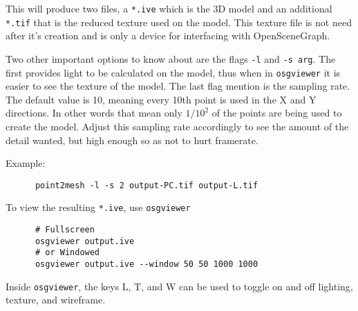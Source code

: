 This will produce two files, a \verb#*.ive# which is the 3D model and
an additional \verb#*.tif# that is the reduced texture used on the
model. This texture file is not need after it's creation and is only a
device for interfacing with OpenSceneGraph.

Two other important options to know about are the flags \verb#-l# and
\verb#-s arg#. The first provides light to be calculated on the model,
thus when in \verb#osgviewer# it is easier to see the texture of the
model. The last flag mention is the sampling rate. The default value
is 10, meaning every 10th point is used in the X and Y directions. In
other words that mean only $1/10^2$ of the points are being used to
create the model. Adjust this sampling rate accordingly to see the
amount of the detail wanted, but high enough so as not to hurt
framerate.

Example:
\begin{verbatim}
      point2mesh -l -s 2 output-PC.tif output-L.tif
\end{verbatim}

To view the resulting \verb#*.ive#, use \verb#osgviewer#

\begin{verbatim}
      # Fullscreen
      osgviewer output.ive
      # or Windowed
      osgviewer output.ive --window 50 50 1000 1000
\end{verbatim}

Inside \verb#osgviewer#, the keys L, T, and W can be used to toggle on
and off lighting, texture, and wireframe.

